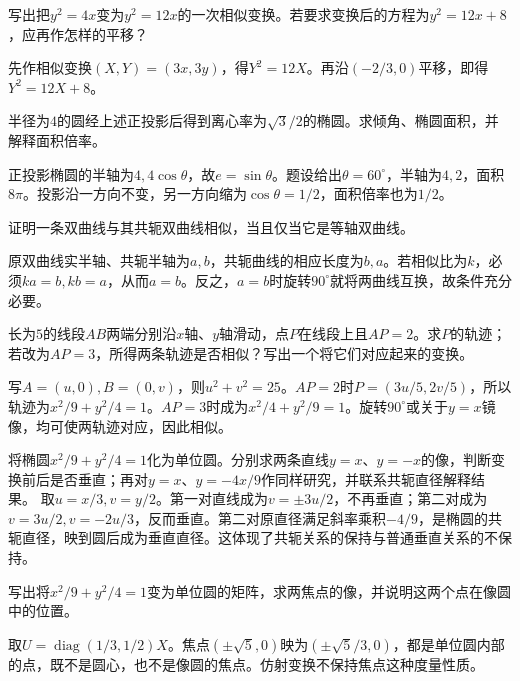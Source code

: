 写出把\(y^2=4x\)变为\(y^2=12x\)的一次相似变换。若要求变换后的方程为\(y^2=12x+8\)，应再作怎样的平移？
\par
\solutionanswer
先作相似变换\((X,Y)=(3x,3y)\)，得\(Y^2=12X\)。再沿\((-2/3,0)\)平移，即得\(Y^2=12X+8\)。


半径为\(4\)的圆经上述正投影后得到离心率为\(\sqrt3/2\)的椭圆。求倾角、椭圆面积，并解释面积倍率。
\par
\solutionanswer
正投影椭圆的半轴为\(4,4\cos\theta\)，故\(e=\sin\theta\)。题设给出\(\theta=60^\circ\)，半轴为\(4,2\)，面积\(8\pi\)。投影沿一方向不变，另一方向缩为\(\cos\theta=1/2\)，面积倍率也为\(1/2\)。


证明一条双曲线与其共轭双曲线相似，当且仅当它是等轴双曲线。
\par
\solutionanswer
原双曲线实半轴、共轭半轴为\(a,b\)，共轭曲线的相应长度为\(b,a\)。若相似比为\(k\)，必须\(ka=b,kb=a\)，从而\(a=b\)。反之，\(a=b\)时旋转\(90^\circ\)就将两曲线互换，故条件充分必要。


长为\(5\)的线段\(AB\)两端分别沿\(x\)轴、\(y\)轴滑动，点\(P\)在线段上且\(AP=2\)。求\(P\)的轨迹；若改为\(AP=3\)，所得两条轨迹是否相似？写出一个将它们对应起来的变换。
\par
\solutionanswer
写\(A=(u,0),B=(0,v)\)，则\(u^2+v^2=25\)。\(AP=2\)时\(P=(3u/5,2v/5)\)，所以轨迹为\(x^2/9+y^2/4=1\)。\(AP=3\)时成为\(x^2/4+y^2/9=1\)。旋转\(90^\circ\)或关于\(y=x\)镜像，均可使两轨迹对应，因此相似。


将椭圆\(x^2/9+y^2/4=1\)化为单位圆。分别求两条直线\(y=x\)、\(y=-x\)的像，判断变换前后是否垂直；再对\(y=x\)、\(y=-4x/9\)作同样研究，并联系共轭直径解释结果。
\solutionanswer
取\(u=x/3,v=y/2\)。第一对直线成为\(v=\pm3u/2\)，不再垂直；第二对成为\(v=3u/2,v=-2u/3\)，反而垂直。第二对原直径满足斜率乘积\(-4/9\)，是椭圆的共轭直径，映到圆后成为垂直直径。这体现了共轭关系的保持与普通垂直关系的不保持。


写出将\(x^2/9+y^2/4=1\)变为单位圆的矩阵，求两焦点的像，并说明这两个点在像圆中的位置。
\par
\solutionanswer
取\(U=\operatorname{diag}(1/3,1/2)X\)。焦点\((\pm\sqrt5,0)\)映为\((\pm\sqrt5/3,0)\)，都是单位圆内部的点，既不是圆心，也不是像圆的焦点。仿射变换不保持焦点这种度量性质。


